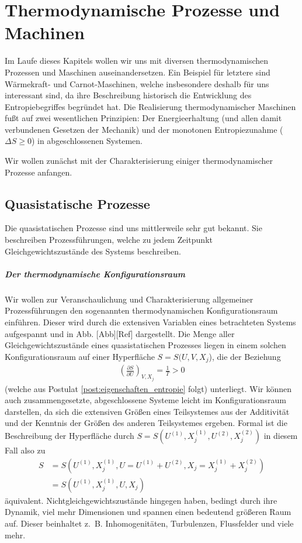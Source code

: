 
\chapter{Thermodynamische Prozesse und Machinen}
Im Laufe dieses Kapitels wollen wir uns mit diversen thermodynamischen Prozessen und Maschinen auseinandersetzen. Ein Beispiel für letztere sind Wärmekraft- und Carnot-Maschinen, welche insbesondere deshalb für uns interessant sind, da ihre Beschreibung historisch die Entwicklung des Entropiebegriffes begründet hat.
Die Realisierung thermodynamischer Maschinen fußt auf zwei wesentlichen Prinzipien: Der Energieerhaltung (und allen damit verbundenen Gesetzen der Mechanik) und der monotonen Entropiezunahme ($\Delta S \geq 0$) in abgeschlossenen Systemen.

Wir wollen zunächst mit der Charakterisierung einiger thermodynamischer Prozesse anfangen.


\section{Quasistatische Prozesse}
Die quasistatischen Prozesse sind uns mittlerweile sehr gut bekannt. Sie beschreiben Prozessführungen, welche zu jedem Zeitpunkt Gleichgewichtszustände des Systems beschreiben.
\paragraph*{Der thermodynamische Konfigurationsraum}
Wir wollen zur Veranschaulichung und Charakterisierung allgemeiner Prozessführungen den sogenannten thermodynamischen Konfigurationsraum einführen. Dieser wird durch die extensiven Variablen eines betrachteten Systems aufgespannt und in Abb. [Abb][Ref] dargestellt.
Die Menge aller Gleichgewichtszustände eines quasistatischen Prozesses liegen in einem solchen Konfigurationsraum auf einer Hyperfläche $S=S(U,V,X_j$), die der Beziehung 
\begin{align*}
    \left(\frac{\partial S}{\partial U}\right)_{V,X_j}=\frac{1}{T}>0
\end{align*}
(welche aus Postulat \ref{post:eigenschaften_entropie} folgt) unterliegt.  
Wir können auch zusammengesetzte, abgeschlossene Systeme leicht im Konfigurationsraum darstellen, da sich die extensiven Größen eines Teilsystemes aus der Additivität und der Kenntnis der Größen des anderen Teilsystemes ergeben. Formal ist die Beschreibung der Hyperfläche durch $S=S(U^{(1)},X_j^{(1)},U^{(2)},X_j^{(2)})$ in diesem Fall also zu 
\begin{align*}
    S&=S(U^{(1)},X_j^{(1)},U=U^{(1)}+U^{(2)},X_j=X_j^{(1)}+X_j^{(2)})\\
    &=S(U^{(1)},X_j^{(1)},U,X_j)
\end{align*}
äquivalent.
Nichtgleichgewichtszustände hingegen haben, bedingt durch ihre Dynamik, viel mehr Dimensionen und spannen einen bedeutend größeren Raum auf. Dieser beinhaltet z.~B. Inhomogenitäten, Turbulenzen, Flussfelder und viele mehr. 


